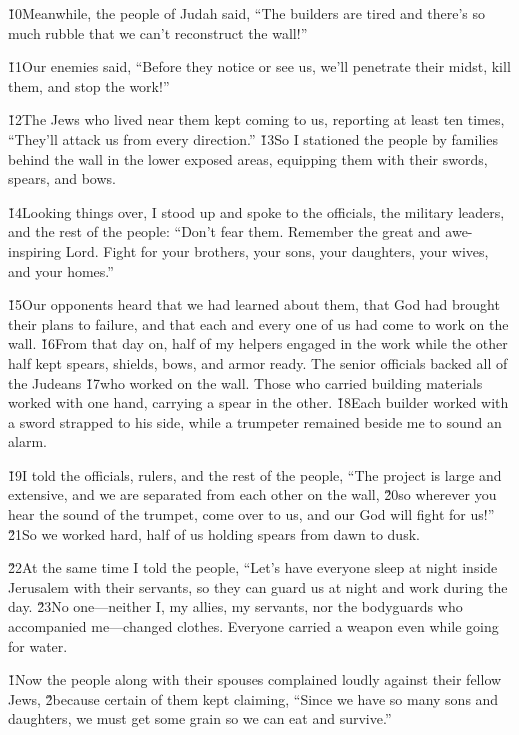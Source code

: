 \v{10}Meanwhile, the people of Judah said, ``The builders are tired and there's so much rubble that we can't reconstruct the wall!''

\v{11}Our enemies said, ``Before they notice or see us, we'll penetrate their midst, kill them, and stop the work!''

\v{12}The Jews who lived near them kept coming to us, reporting at least ten times, ``They'll attack us from every direction.'' \v{13}So I stationed the people by families behind the wall in the lower exposed areas, equipping them with their swords, spears, and bows.

\v{14}Looking things over, I stood up and spoke to the officials, the military leaders, and the rest of the people: ``Don't fear them. Remember the great and awe-inspiring Lord. Fight for your brothers, your sons, your daughters, your wives, and your homes.''

\v{15}Our opponents heard that we had learned about them, that God had brought their plans to failure, and that each and every one of us had come to work on the wall. \v{16}From that day on, half of my helpers engaged in the work while the other half kept spears, shields, bows, and armor ready. The senior officials backed all of the Judeans \v{17}who worked on the wall. Those who carried building materials worked with one hand, carrying a spear in the other. \v{18}Each builder worked with a sword strapped to his side, while a trumpeter remained beside me to sound an alarm.

\v{19}I told the officials, rulers, and the rest of the people, ``The project is large and extensive, and we are separated from each other on the wall, \v{20}so wherever you hear the sound of the trumpet, come over to us, and our God will fight for us!'' \v{21}So we worked hard, half of us holding spears from dawn to dusk.

\v{22}At the same time I told the people, ``Let's have everyone sleep at night inside Jerusalem with their servants, so they can guard us at night and work during the day. \v{23}No one---neither I, my allies, my servants, nor the bodyguards who accompanied me---changed clothes. Everyone carried a weapon even while going for water.

\v{1}Now the people along with their spouses complained loudly against their fellow Jews, \v{2}because certain of them kept claiming, ``Since we have so many sons and daughters, we must get some grain so we can eat and survive.''

